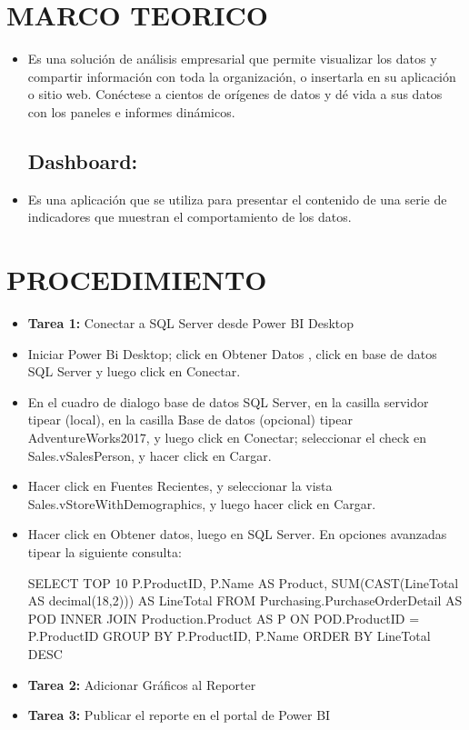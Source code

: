 \documentclass[12pt,letterpaper]{article}
\begin{document}
\section{MARCO TEORICO}
\begin{itemize}
\subsection{Power Bi:}
	\item Es una solución de análisis empresarial que permite visualizar los datos y compartir información con toda la organización, o insertarla en su aplicación o sitio web. Conéctese a cientos de orígenes de datos y dé vida a sus datos con los paneles e informes dinámicos.
\subsection{Dashboard:}
	\item Es una aplicación que se utiliza para presentar el
contenido de una serie de indicadores que muestran el comportamiento de los datos. 
\end{itemize}
\section{PROCEDIMIENTO}
\begin{itemize}
	\item \textbf{Tarea 1:} Conectar a SQL Server desde Power BI Desktop 
	\item Iniciar Power Bi Desktop; click en Obtener Datos , click en base de datos SQL Server y luego click en Conectar.
	\item En el cuadro de dialogo base de datos SQL Server, en la casilla servidor tipear (local), en la casilla Base de
datos (opcional) tipear AdventureWorks2017, y luego click en Conectar; seleccionar el check en Sales.vSalesPerson, y hacer
click en Cargar. 
	\item Hacer click en Fuentes Recientes, y seleccionar la vista Sales.vStoreWithDemographics, y luego hacer click en Cargar.
	\item Hacer click en Obtener datos, luego en SQL Server. En opciones avanzadas tipear la siguiente consulta:
\par SELECT TOP 10 P.ProductID, P.Name AS Product, SUM(CAST(LineTotal AS decimal(18,2))) AS LineTotal FROM
Purchasing.PurchaseOrderDetail AS POD INNER JOIN Production.Product AS P ON POD.ProductID = P.ProductID
GROUP BY P.ProductID, P.Name ORDER BY LineTotal DESC 

	\item \textbf{Tarea 2:} Adicionar Gráficos al Reporter

	\item \textbf{Tarea 3:} Publicar el reporte en el portal de Power BI
\end{itemize}
\end{document}

